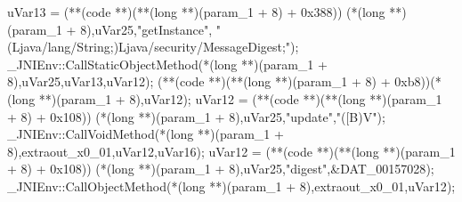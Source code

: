\documentclass[
]{article}
\newenvironment{Shaded}{}{}
\newcommand{\BaseNTok}[1]{\textcolor[rgb]{0.25,0.63,0.44}{#1}}
\newcommand{\DataTypeTok}[1]{\textcolor[rgb]{0.56,0.13,0.00}{#1}}
\newcommand{\DecValTok}[1]{\textcolor[rgb]{0.25,0.63,0.44}{#1}}
\newcommand{\NormalTok}[1]{#1}
\newcommand{\OperatorTok}[1]{\textcolor[rgb]{0.40,0.40,0.40}{#1}}
\newcommand{\StringTok}[1]{\textcolor[rgb]{0.25,0.44,0.63}{#1}}
\begin{document}
\begin{Shaded}
\begin{Highlighting}[]
\NormalTok{  uVar13 }\OperatorTok{=} \OperatorTok{(**(}\NormalTok{code }\OperatorTok{**)(**(}\DataTypeTok{long} \OperatorTok{**)(}\NormalTok{param\_1 }\OperatorTok{+} \DecValTok{8}\OperatorTok{)} \OperatorTok{+} \BaseNTok{0x388}\OperatorTok{))}
                     \OperatorTok{(*(}\DataTypeTok{long} \OperatorTok{**)(}\NormalTok{param\_1 }\OperatorTok{+} \DecValTok{8}\OperatorTok{),}\NormalTok{uVar25}\OperatorTok{,}\StringTok{"getInstance"}\OperatorTok{,}
                      \StringTok{"(Ljava/lang/String;)Ljava/security/MessageDigest;"}\OperatorTok{);}
\NormalTok{  \_JNIEnv}\OperatorTok{::}\NormalTok{CallStaticObjectMethod}\OperatorTok{(*(}\DataTypeTok{long} \OperatorTok{**)(}\NormalTok{param\_1 }\OperatorTok{+} \DecValTok{8}\OperatorTok{),}\NormalTok{uVar25}\OperatorTok{,}\NormalTok{uVar13}\OperatorTok{,}\NormalTok{uVar12}\OperatorTok{);}
  \OperatorTok{(**(}\NormalTok{code }\OperatorTok{**)(**(}\DataTypeTok{long} \OperatorTok{**)(}\NormalTok{param\_1 }\OperatorTok{+} \DecValTok{8}\OperatorTok{)} \OperatorTok{+} \BaseNTok{0xb8}\OperatorTok{))(*(}\DataTypeTok{long} \OperatorTok{**)(}\NormalTok{param\_1 }\OperatorTok{+} \DecValTok{8}\OperatorTok{),}\NormalTok{uVar12}\OperatorTok{);}
\NormalTok{  uVar12 }\OperatorTok{=} \OperatorTok{(**(}\NormalTok{code }\OperatorTok{**)(**(}\DataTypeTok{long} \OperatorTok{**)(}\NormalTok{param\_1 }\OperatorTok{+} \DecValTok{8}\OperatorTok{)} \OperatorTok{+} \BaseNTok{0x108}\OperatorTok{))}
                     \OperatorTok{(*(}\DataTypeTok{long} \OperatorTok{**)(}\NormalTok{param\_1 }\OperatorTok{+} \DecValTok{8}\OperatorTok{),}\NormalTok{uVar25}\OperatorTok{,}\StringTok{"update"}\OperatorTok{,}\StringTok{"([B)V"}\OperatorTok{);}
\NormalTok{  \_JNIEnv}\OperatorTok{::}\NormalTok{CallVoidMethod}\OperatorTok{(*(}\DataTypeTok{long} \OperatorTok{**)(}\NormalTok{param\_1 }\OperatorTok{+} \DecValTok{8}\OperatorTok{),}\NormalTok{extraout\_x0\_01}\OperatorTok{,}\NormalTok{uVar12}\OperatorTok{,}\NormalTok{uVar16}\OperatorTok{);}
\NormalTok{  uVar12 }\OperatorTok{=} \OperatorTok{(**(}\NormalTok{code }\OperatorTok{**)(**(}\DataTypeTok{long} \OperatorTok{**)(}\NormalTok{param\_1 }\OperatorTok{+} \DecValTok{8}\OperatorTok{)} \OperatorTok{+} \BaseNTok{0x108}\OperatorTok{))}
                     \OperatorTok{(*(}\DataTypeTok{long} \OperatorTok{**)(}\NormalTok{param\_1 }\OperatorTok{+} \DecValTok{8}\OperatorTok{),}\NormalTok{uVar25}\OperatorTok{,}\StringTok{"digest"}\OperatorTok{,\&}\NormalTok{DAT\_00157028}\OperatorTok{);}
\NormalTok{  \_JNIEnv}\OperatorTok{::}\NormalTok{CallObjectMethod}\OperatorTok{(*(}\DataTypeTok{long} \OperatorTok{**)(}\NormalTok{param\_1 }\OperatorTok{+} \DecValTok{8}\OperatorTok{),}\NormalTok{extraout\_x0\_01}\OperatorTok{,}\NormalTok{uVar12}\OperatorTok{);}

\end{Highlighting}
\end{Shaded}
\end{document}
